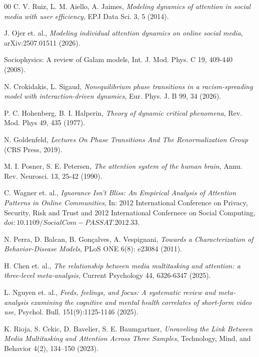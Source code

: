 \documentclass[preprint,12pt]{elsarticle}
\begin{document}
\begin{thebibliography}{00}
C. V. Ruiz, L. M. Aiello, A. Jaimes, \textit{Modeling dynamics of attention in social media with user efficiency}, EPJ Data Sci. 3, 5 (2014).  


J. Ojer et. al., \textit{Modeling individual attention dynamics on online social media}, arXiv:2507.01511 (2026).


Sociophysics: A review of Galam models, Int. J. Mod. Phys. C 19, 409-440 (2008).


N. Crokidakis, L. Sigaud, \textit{Nonequilibrium phase transitions in a racism-spreading model with interaction-driven dynamics}, Eur. Phys. J. B 99, 34 (2026).




P. C. Hohenberg, B. I. Halperin, \textit{Theory of dynamic critical phenomena}, Rev. Mod. Phys 49, 435 (1977).


N. Goldenfeld, \textit{Lectures On Phase Transitions And The Renormalization Group } (CRS Press, 2019).




 M. I. Posner, S. E. Petersen, \textit{The attention system of the human brain}, Annu. Rev. Neurosci. 13, 25-42 (1990). 


C. Wagner et. al., \textit{Ignorance Isn't Bliss: An Empirical Analysis of Attention Patterns in Online Communities}, In: 2012 International Conference on Privacy, Security, Risk and Trust and 2012 International Confernece on Social Computing, $doi:10.1109/SocialCom-PASSAT.2012.33$.


N. Perra, D. Balcan, B. Gonçalves, A.  Vespignani, \textit{Towards a Characterization of Behavior-Disease Models}, PLoS ONE 6(8): e23084 (2011).

  
H. Chen et. al., \textit{The relationship between media multitasking and attention: a three-level meta-analysis}, Current Psychology 44, 6326-6347 (2025).


L. Nguyen et. al., \textit{Feeds, feelings, and focus: A systematic review and meta-analysis examining the cognitive and mental health correlates of short-form video use}, Psychol. Bull. 151(9):1125-1146 (2025).



K. Rioja, S. Cekic, D. Bavelier, S. E. Baumgartner, \textit{Unraveling the Link Between Media Multitasking and Attention Across Three Samples}, Technology, Mind, and Behavior 4(2), 134–150 (2023).





\end{thebibliography}
\end{document}
